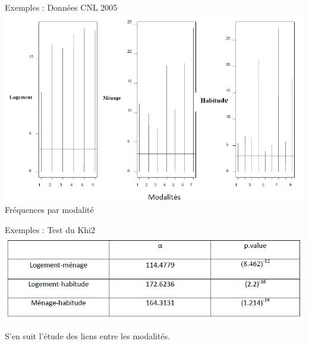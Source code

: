 \documentclass[10pt]{beamer}
\begin{document}
\begin{frame}{Exemples : Données CNL 2005}
\includegraphics[scale=.5]{CNL8} 
Fréquences par modalité 
\end{frame}



\begin{frame}{Exemples : Test du Khi2}
\includegraphics[scale=.45]{CNL9} 



S'en suit l'étude des liens entre les modalités.
\end{frame}
\end{document}
